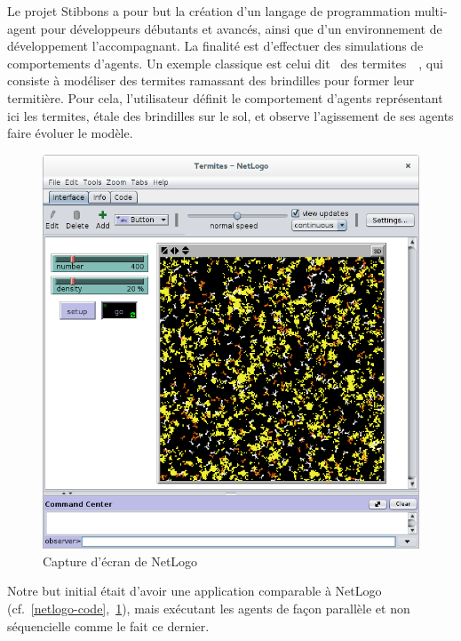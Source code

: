 
Le projet Stibbons a pour but la création d'un langage de programmation multi-agent pour développeurs débutants et avancés, ainsi que d'un environnement de développement l'accompagnant.
La finalité est d'effectuer des simulations de comportements d'agents. Un exemple classique est celui dit \og~des termites~\fg~, qui consiste à modéliser des termites ramassant des brindilles pour former leur termitière.
Pour cela, l'utilisateur définit le comportement d'agents représentant ici les termites, étale des brindilles sur le sol, et observe l'agissement de ses agents faire évoluer le modèle.

\begin{figure}[h]
\centering
\includegraphics[scale=0.3]{doc/gestionProjet/netlogo-termites.png}
\caption{\label{netlogo-termites} Capture d'écran de NetLogo}
\end{figure}

Notre but initial était d'avoir une application comparable à NetLogo (cf.~\ref{netlogo-code},~\ref{netlogo-termites}), mais exécutant les agents de façon parallèle et non séquencielle comme le fait ce dernier.

